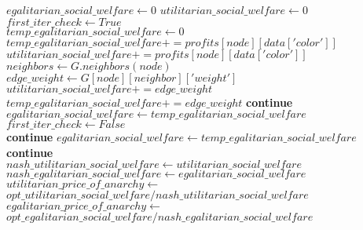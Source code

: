 \begin{algorithmic}
\State $egalitarian\_social\_welfare\gets 0$
\State $utilitarian\_social\_welfare\gets 0$
\State $first\_iter\_check\gets True$ \\

	\State $temp\_egalitarian\_social\_welfare\gets 0$
	\State $temp\_egalitarian\_social\_welfare += profits[node][data['color']]$
	\State $utilitarian\_social\_welfare += profits[node][data['color']]$
	\State $neighbors\gets G.neighbors(node)$
			\State $edge\_weight\gets G[node][neighbor]['weight']$
			\State $utilitarian\_social\_welfare += edge\_weight$
			\State $temp\_egalitarian\_social\_welfare += edge\_weight$
		\Else
			\State \textbf{continue}
		\EndIf
			\State $egalitarian\_social\_welfare\gets temp\_egalitarian\_social\_welfare$
			\State $first\_iter\_check\gets False$ \\
			\State \textbf{continue}
		\EndIf
			\State $egalitarian\_social\_welfare\gets temp\_egalitarian\_social\_welfare$
		\Else
			\State \textbf{continue}
		\EndIf
	\EndFor
\EndFor \\

\State $nash\_utilitarian\_social\_welfare\gets utilitarian\_social\_welfare$
\State $nash\_egalitarian\_social\_welfare\gets egalitarian\_social\_welfare$ \\

	\State $utilitarian\_price\_of\_anarchy\gets$ \\
	$opt\_utilitarian\_social\_welfare / nash\_utilitarian\_social\_welfare$
\EndIf
{}
	\State $egalitarian\_price\_of\_anarchy\gets$ \\
	$opt\_egalitarian\_social\_welfare / nash\_egalitarian\_social\_welfare$
\EndIf


\end{algorithmic}

%
